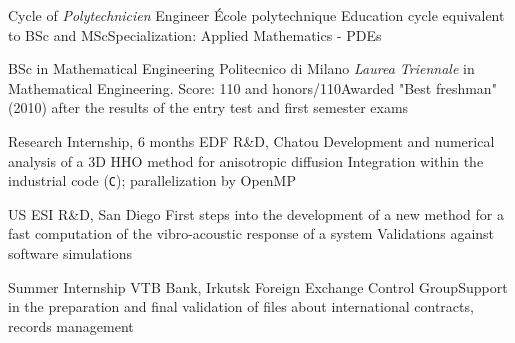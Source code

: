 \documentclass[english]{RMcv}
\begin{document}

%
%
        {Cycle of \textit{Polytechnicien} Engineer}%
        {École polytechnique}%
        {Education cycle equivalent to BSc and MSc}{Specialization: Applied Mathematics - PDEs}


%
%
        {BSc in Mathematical Engineering}%
        {Politecnico di Milano}%
        {\emph{Laurea Triennale} in Mathematical Engineering. Score: 110 and honors/110}{Awarded "Best freshman" (2010) after the results of the entry test and first semester exams}


%
%
        {Research Internship, 6 months}%
        {EDF R\&D, Chatou}%
        {Development and numerical analysis of a 3D HHO method for anisotropic diffusion}%
        {Integration within the industrial code \cs{} (\texttt{C}); parallelization by OpenMP}


%
%
        {US ESI R\&D, San Diego}%
        {First steps into the development of a new method for a fast computation of the vibro-acoustic response of a system}%
        {Validations against software simulations}


%
%
        {Summer Internship}%
        {VTB Bank, Irkutsk}%
        {Foreign Exchange Control Group}{Support in the preparation and final validation of files about international contracts, records management}
\end{document}
